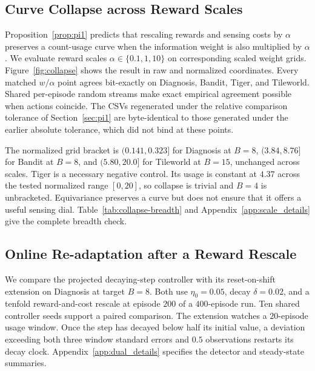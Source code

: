 \subsection{Curve Collapse across Reward Scales}
\label{sec:collapse}

Proposition~\ref{prop:pi1} predicts that rescaling rewards and sensing costs by $\alpha$ preserves a count-usage curve when the information weight is also multiplied by $\alpha$. We evaluate reward scales $\alpha\in\{0.1,1,10\}$ on corresponding scaled weight grids. Figure~\ref{fig:collapse} shows the result in raw and normalized coordinates. Every matched $w/\alpha$ point agrees bit-exactly on Diagnosis, Bandit, Tiger, and Tileworld. Shared per-episode random streams make exact empirical agreement possible when actions coincide. The CSVs regenerated under the relative comparison tolerance of Section~\ref{sec:pi1} are byte-identical to those generated under the earlier absolute tolerance, which did not bind at these points.

The normalized grid bracket is $(0.141,0.323]$ for Diagnosis at $B{=}8$, $(3.84,8.76]$ for Bandit at $B{=}8$, and $(5.80,20.0]$ for Tileworld at $B{=}15$, unchanged across scales. Tiger is a necessary negative control. Its usage is constant at $4.37$ across the tested normalized range $[0,20]$, so collapse is trivial and $B{=}4$ is unbracketed. Equivariance preserves a curve but does not ensure that it offers a useful sensing dial. Table~\ref{tab:collapse-breadth} and Appendix~\ref{app:scale_details} give the complete breadth check.


\subsection{Online Re-adaptation after a Reward Rescale}
\label{sec:dual_multiseed}

We compare the projected decaying-step controller with its reset-on-shift extension on Diagnosis at target $B{=}8$. Both use $\eta_0{=}0.05$, decay $\delta{=}0.02$, and a tenfold reward-and-cost rescale at episode $200$ of a $400$-episode run. Ten shared controller seeds support a paired comparison. The extension watches a $20$-episode usage window. Once the step has decayed below half its initial value, a deviation exceeding both three window standard errors and $0.5$ observations restarts its decay clock. Appendix~\ref{app:dual_details} specifies the detector and steady-state summaries.

